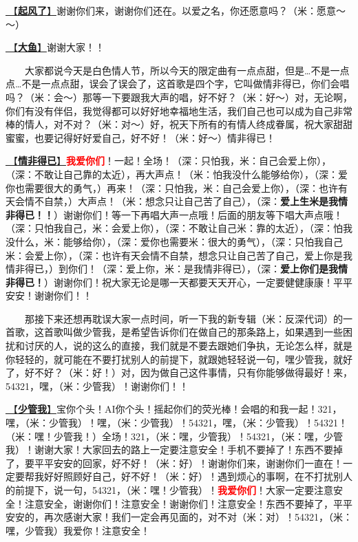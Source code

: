 \documentclass[]{ctexbook}
\begin{document}
\hyperref[the-wind-rises]{🎵【\textbf{起风了}】}谢谢你们来，谢谢你们还在。以爱之名，你还愿意吗？（米：愿意～～）

\hyperref[big-fish]{🎵【\textbf{大鱼}】}谢谢大家！！

  大家都说今天是白色情人节，所以今天的限定曲有一点点甜，但是\ldots 不是一点点\ldots 不是一点点甜，误会了误会了，这首歌是四个字，它叫做情非得已，你们会唱吗？（米：会～）那等一下要跟我大声的唱，好不好？（米：好～）对，无论啊，你们有没有伴侣，我觉得都可以好好地幸福地生活，我们自己也可以成为自己非常棒的情人，对不对？（米：对～）好，祝天下所有的有情人终成眷属，祝大家甜甜蜜蜜，也要记得好好爱自己，好不好！（米：好～）情非得已！

\hyperref[under-the-circumstances]{🎵【\textbf{情非得已}】}\textbf{\textcolor{red}{我爱你们}}！一起！全场！（深：只怕我，米：自己会爱上你），（深：不敢让自己靠的太近），再大声点！（米：怕我没什么能够给你），（深：爱你也需要很大的勇气，）再来！（深：只怕我，米：自己会爱上你），（深：也许有天会情不自禁，）大声点！（米：想念只让自己苦了自己），（深：\textbf{爱上生米是我情非得已！！}）谢谢你们！等一下再唱大声一点哦！后面的朋友等下唱大声点哦！（深：只怕我自己，米：会爱上你），（深：不敢让自己米：靠的太近），（深：怕我没什么，米：能够给你），（深：爱你也需要米：很大的勇气），（深：只怕我自己米：会爱上你），（深：也许有天会情不自禁，想念只让自己苦了自己，爱上你是我情非得已，）到你们！（深：爱上你，米：是我情非得已），（深：\textbf{爱上你们是我情非得已！}）谢谢你们！祝大家无论是哪一天都要天天开心，一定要健健康康！平平安安！谢谢你们！！

  那接下来还想再耽误大家一点时间，听一下我的新专辑（米：反深代词）的一首歌，这首歌叫做少管我，是希望告诉你们在做自己的那条路上，如果遇到一些困扰和讨厌的人，说的这么的直接，我们就是不要去跟她们争执，无论怎么样，就是你轻轻的，就可能在不要打扰别人的前提下，就跟她轻轻说一句，嘿少管我，就好了，好不好？（米：好！）对，因为做自己这件事情，只有你能够做得最好！来，54321，嘿，（米：少管我）！谢谢你们！！

\hyperref[watch-ur-manners]{🎵【\textbf{少管我}】}宝你个头！AI你个头！摇起你们的荧光棒！会唱的和我一起！321，嘿，（米：少管我）！嘿，（米：少管我）！54321，嘿，（米：少管我）！54321！（米：嘿！少管我！）全场！321，（米：嘿，少管我）！54321，（米：嘿，少管我）！谢谢大家！大家回去的路上一定要注意安全！手机不要掉了！东西不要掉了，要平平安安的回家，好不好！（米：好）！谢谢你们来，谢谢你们一直在！一定要帮我好好照顾好自己，好不好！（米：好）！遇到烦心的事啊，在不打扰别人的前提下，说一句，54321，（米：嘿！少管我）！\textbf{\textcolor{red}{我爱你们}}！大家一定要注意安全！注意安全，谢谢你们！注意安全！谢谢你们！注意安全！东西不要掉了，平平安安的，再次感谢大家！我们一定会再见面的，对不对（米：对）！54321，（米：嘿，少管我）我爱你！注意安全！
\end{document}
